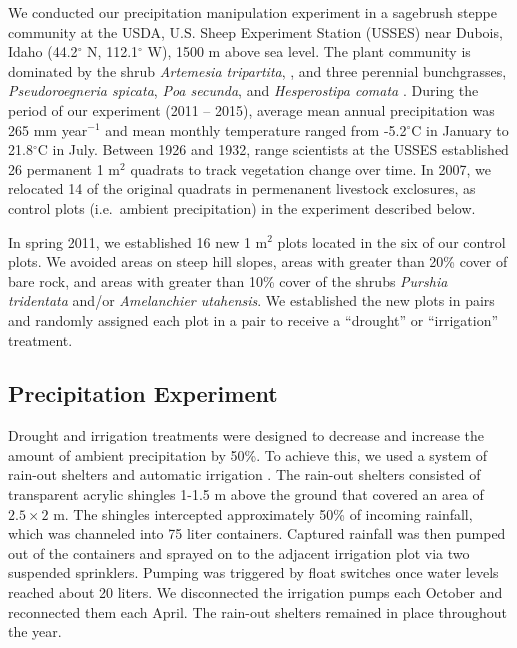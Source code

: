 \documentclass[fleqn,10pt,lineno]{wlpeerj} %
\begin{document}
We conducted our precipitation manipulation experiment in a sagebrush
steppe community at the USDA, U.S. Sheep Experiment Station (USSES) near
Dubois, Idaho (44.2\(^{\circ}\) N, 112.1\(^{\circ}\) W), 1500 m above
sea level. The plant community is dominated by the shrub
\emph{Artemesia tripartita},
, and three
perennial bunchgrasses, \emph{Pseudoroegneria spicata},
\emph{Poa secunda}, and \emph{Hesperostipa comata}
. During the period of
our experiment (2011 -- 2015), average mean annual precipitation was 265
mm year\(\phantom{}^{-1}\) and mean monthly temperature ranged from
-5.2\(^{\circ}\)C in January to 21.8\(^{\circ}\)C in July. Between 1926
and 1932, range scientists at the USSES established 26 permanent 1
m\(^2\) quadrats to track vegetation change over time. In 2007, we
relocated 14 of the original quadrats in permenanent livestock
exclosures,  as control plots (i.e.~ambient
precipitation) in the experiment described below.

In spring 2011, we established 16 new 1 m\(^2\) plots located in the
 six of our
control plots. We avoided areas on steep hill slopes, areas with greater
than 20\% cover of bare rock, and areas with greater than 10\% cover of
the shrubs \emph{Purshia tridentata} and/or
\emph{Amelanchier utahensis}. We established the new plots in pairs and
randomly assigned each plot in a pair to receive a ``drought'' or
``irrigation'' treatment.

\subsection{Precipitation Experiment}\label{precipitation-experiment}

Drought and irrigation treatments were designed to decrease and increase
the amount of ambient precipitation by 50\%. To achieve this, we used a
system of rain-out shelters and automatic irrigation
\citep{Gherardi2013}. The rain-out shelters consisted of transparent
acrylic shingles 1-1.5 m above the ground that covered an area of
\(2.5\times2\) m. The shingles intercepted approximately 50\% of
incoming rainfall, which was channeled into 75 liter containers.
Captured rainfall was then pumped out of the containers and sprayed on
to the adjacent irrigation plot via two suspended sprinklers. Pumping
was triggered by float switches once water levels reached about 20
liters. We disconnected the irrigation pumps each October and
reconnected them each April. The rain-out shelters remained in place
throughout the year.
\end{document}
